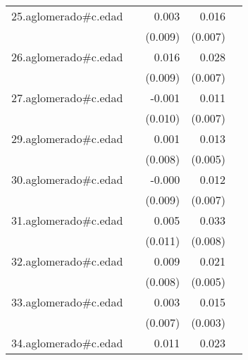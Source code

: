 {\begin{longtable}{l*{4}{D{.}{.}{-1}}}
\addlinespace
25.aglomerado#c.edad&                     &       0.003         &       0.016\sym{*}  &                     \\
            &                     &     (0.009)         &     (0.007)         &                     \\
\addlinespace
26.aglomerado#c.edad&                     &       0.016         &       0.028\sym{***}&                     \\
            &                     &     (0.009)         &     (0.007)         &                     \\
\addlinespace
27.aglomerado#c.edad&                     &      -0.001         &       0.011         &                     \\
            &                     &     (0.010)         &     (0.007)         &                     \\
\addlinespace
29.aglomerado#c.edad&                     &       0.001         &       0.013\sym{*}  &                     \\
            &                     &     (0.008)         &     (0.005)         &                     \\
\addlinespace
30.aglomerado#c.edad&                     &      -0.000         &       0.012         &                     \\
            &                     &     (0.009)         &     (0.007)         &                     \\
\addlinespace
31.aglomerado#c.edad&                     &       0.005         &       0.033\sym{***}&                     \\
            &                     &     (0.011)         &     (0.008)         &                     \\
\addlinespace
32.aglomerado#c.edad&                     &       0.009         &       0.021\sym{***}&                     \\
            &                     &     (0.008)         &     (0.005)         &                     \\
\addlinespace
33.aglomerado#c.edad&                     &       0.003         &       0.015\sym{***}&                     \\
            &                     &     (0.007)         &     (0.003)         &                     \\
\addlinespace
34.aglomerado#c.edad&                     &       0.011         &       0.023\sym{***}&                     \\

\end{longtable}}
